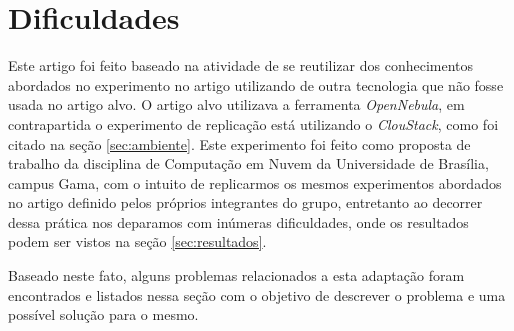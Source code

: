   \section{Dificuldades}
  \label{sec:dificuldades}

  Este artigo foi feito baseado na atividade de se reutilizar dos conhecimentos abordados no experimento no artigo \cite{coutinho_et_al:14} utilizando de outra tecnologia que não fosse usada no artigo alvo. O artigo alvo utilizava a ferramenta \textit{OpenNebula}, em contrapartida o experimento de replicação está utilizando o \textit{ClouStack}, como foi citado na seção \ref{sec:ambiente}. Este experimento foi feito como proposta de trabalho da disciplina de Computação em Nuvem da Universidade de Brasília, campus Gama, com o intuito de replicarmos os mesmos experimentos abordados no artigo definido pelos próprios integrantes do grupo, entretanto ao decorrer dessa prática nos deparamos com inúmeras dificuldades, onde os resultados podem ser vistos na seção \ref{sec:resultados}.

  Baseado neste fato, alguns problemas relacionados a esta adaptação foram encontrados e listados nessa seção com o objetivo de descrever o problema e uma possível solução para o mesmo.

